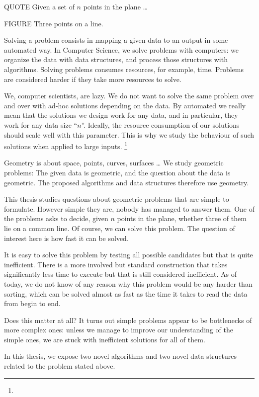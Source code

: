 


QUOTE Given a set of \(n\) points in the plane \dots

FIGURE Three points on a line.

Solving a problem consists in mapping a given data to an output in some
automated way.
In Computer Science, we solve problems with computers: we organize the data
with data structures, and process those structures with algorithms.
%
Solving problems consumes resources, for example, time.
Problems are considered harder if they take more resources to solve.

We, computer scientists, are lazy. We do not want to solve the same problem
over and over with ad-hoc solutions depending on the data.
%
By automated we really mean that the solutions we
design work for any data, and in particular, they work for any data size
``\(n\)''.
%
Ideally, the resource consumption of our solutions should scale well with this
parameter.
%
This is why we study the behaviour of such solutions when applied to large
inputs.%
\footnote{%
}

Geometry is about space, points, curves, surfaces \dots
We study geometric problems:
%
The given data is geometric, and the question about the data is geometric.
The proposed algorithms and data structures therefore use geometry.

This thesis studies questions about geometric problems that are simple to
formulate. However simple they are, nobody
has managed to answer them. One of the problems asks to decide, given \(n\) points in the plane,
whether three of them lie on a common line. Of course, we can solve this
problem. The question of interest here is how fast it can be solved.

It is easy to solve this problem by testing all possible candidates but that is
quite inefficient. There is a
more involved but standard construction that takes significantly less time to
execute but that is still considered inefficient. As of today, we do not know of
any reason why this problem would be any harder than sorting, which can be
solved almost as fast as the time it takes to read the data from begin to end.

Does this matter at all? It turns out simple problems appear to
be bottlenecks of more complex ones: unless we manage to improve our
understanding of the simple ones, we are stuck with inefficient solutions for
all of them.

In this thesis, we expose two novel algorithms and two novel data
structures related to the problem stated above.
